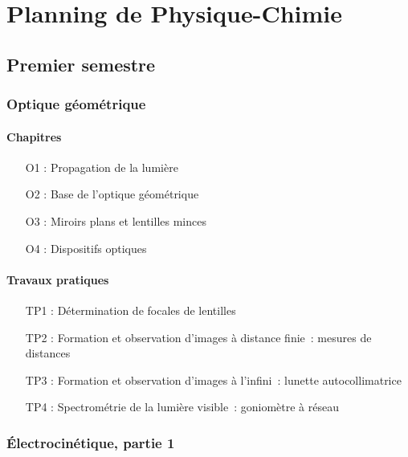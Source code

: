 \documentclass[a4paper, 10pt, final, garamond]{book}
\begin{document}
\setcounter{chapter}{-1}

\chapter*{Planning de Physique-Chimie}

\section{Premier semestre}
\subsection{Optique géométrique}

\begin{multicols}{2}
	\subsubsection{Chapitres}

	\begin{itemize}[label=$\diamond$]
		\item[O1]: Propagation de la lumière
		\item[O2]: Base de l'optique géométrique
		\item[O3]: Miroirs plans et lentilles minces
		\item[O4]: Dispositifs optiques
	\end{itemize}
	\columnbreak
	\subsubsection{Travaux pratiques}

	\begin{itemize}[label=$\diamond$]
		\item[TP1]: Détermination de focales de lentilles
		\item[TP2]: Formation et observation d'images à distance finie~: mesures de
		distances
		\item[TP3]: Formation et observation d'images à l'infini~: lunette
		autocollimatrice
		\item[TP4]: Spectrométrie de la lumière visible~: goniomètre à réseau
	\end{itemize}
\end{multicols}

\subsection{Électrocinétique, partie 1}
\end{document}
